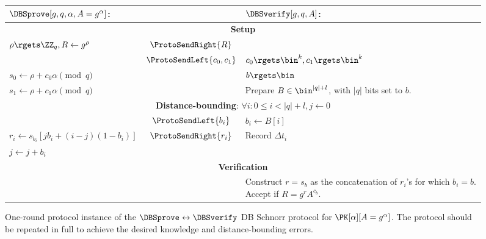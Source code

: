 \begin{figure*}
  \centering
  \begin{tabular}{p{}cp{}}
    \(\DBSprove[g, q, \alpha, A = g^\alpha]\):
    & &
    \(\DBSverify[g, q, A]\):
    \\
    \midrule

    \multicolumn{3}{c}{\textbf{Setup}} \\

    \(\rho\rgets \ZZ_q, R\gets g^{\rho}\)
    & \(\ProtoSendRight{R}\)
    &
    \\

    & \(\ProtoSendLeft{c_0, c_1}\)
    & \(c_0\rgets \bin^k, c_1\rgets \bin^k\)
    \\

    \(s_0\gets \rho + c_0\alpha \pmod q\)
    &
    & \(b\rgets \bin\)
    \\

    \(s_1\gets \rho + c_1\alpha \pmod q\)
    &
    & Prepare \(B\in \bin^{|q|+l}\), with \(|q|\) bits set to \(b\).
    \\

    \midrule
    \multicolumn{3}{c}{\textbf{Distance-bounding}: \(\forall i: 0\leq i < |q| + 
        l, j\gets 0\)} \\


    & \(\ProtoSendLeft{b_i}\)
    & \(b_i\gets B[i]\)
    \\

    \(r_i\gets s_{b_i}[jb_i + (i-j)(1-b_i)]\)
    & \(\ProtoSendRight{r_i}\)
    & Record \(\Delta t_i\)
    \\

    \(j \gets j + b_i\)
    &
    &
    \\

    \midrule
    \multicolumn{3}{c}{\textbf{Verification}}
    \\

    &
    & Construct \(r = s_b\) as the concatenation of \(r_i\)'s for which \(b_i = 
      b\).
      Accept if \(R = g^r A^{c_b}\).
    \\
    
  \end{tabular}
  \caption{%
    One-round protocol instance of the \(\DBSprove\leftrightarrow \DBSverify\) \ac{DB} Schnorr protocol for \(\PK[\alpha][A = g^\alpha]\).
    The protocol should be repeated in full to achieve the desired knowledge and distance-bounding errors.
  }%
  \label{SchnorrFigure}
\end{figure*}

